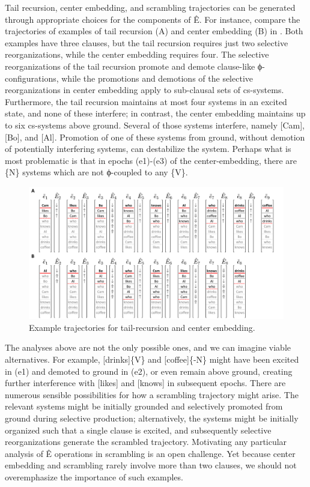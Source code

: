   Tail recursion, center embedding, and scrambling trajectories can be generated through appropriate choices for the components of Ê. For instance, compare the trajectories of examples of tail recursion (A) and center embedding (B) in {}. Both examples have three clauses, but the tail recursion requires just two selective reorganizations, while the center embedding requires four. The selective reorganizations of the tail recursion promote and demote clause-like ϕ-configurations, while the promotions and demotions of the selective reorganizations in center embedding apply to sub-clausal sets of cs-systems. Furthermore, the tail recursion maintains at most four systems in an excited state, and none of these interfere; in contrast, the center embedding maintains up to six cs-systems above ground. Several of those systems interfere, namely [Cam], [Bo], and [Al]. Promotion of one of these systems from ground, without demotion of potentially interfering systems, can destabilize the system. Perhaps what is most problematic is that in epochs (e1)-(e3) of the center-embedding, there are \{N\} systems which are not ϕ-coupled to any \{V\}.

  
\begin{figure}
\includegraphics[width=\textwidth]{figures/Tilsen-img119.png}
\caption{Example trajectories for tail-recursion and center embedding.}
\label{fig:5:15}
\end{figure}
 
   The analyses above are not the only possible ones, and we can imagine viable alternatives. For example, [drinks]\{V\} and [coffee]\{-N\} might have been excited in (e1) and demoted to ground in (e2), or even remain above ground, creating further interference with [likes] and [knows] in subsequent epochs. There are numerous sensible possibilities for how a scrambling trajectory might arise. The relevant systems might be initially grounded and selectively promoted from ground during selective production; alternatively, the systems might be initially organized such that a single clause is excited, and subsequently selective reorganizations generate the scrambled trajectory. Motivating any particular analysis of Ê operations in scrambling is an open challenge. Yet because center embedding and scrambling rarely involve more than two clauses, we should not overemphasize the importance of such examples.

